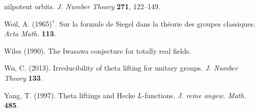 \begin{list}{}{\setlength{\leftmargin}{1.5em}\setlength{\itemindent}{-1.5em}\setlength{\itemsep}{2pt}\setlength{\parsep}{0pt}}
  nilpotent orbits. \emph{J. Number Theory} \textbf{271}, 122--149.
\item Weil, A. (1965)$^*$. Sur la formule de Siegel dans la th\'eorie des groupes classiques.
  \emph{Acta Math.} \textbf{113}.
\item Wiles (1990). The Iwasawa conjecture for totally real fields.
\item Wu, C. (2013). Irreducibility of theta lifting for unitary groups. \emph{J. Number Theory}
  \textbf{133}.
\item Yang, T. (1997). Theta liftings and Hecke $L$-functions. \emph{J. reine angew. Math.}
  \textbf{485}.
\end{list}\endgroup
